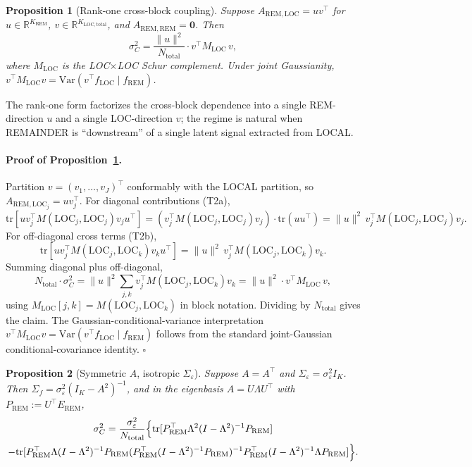 \documentclass[11pt,letterpaper]{article}
\newtheorem{proposition}{Proposition}
\theoremstyle{remark}
\newcommand{\REM}{\mathrm{REM}}
\newcommand{\LOC}{\mathrm{LOC}}
\newcommand{\Sigmaf}{\Sigma_f}
\newcommand{\Sigmae}{\Sigma_\varepsilon}
\newcommand{\Mloc}{M_{\LOC}}
\newcommand{\Ntot}{N_{\mathrm{total}}}
\newcommand{\sigC}{\sigma^2_C}
\newcommand{\trace}{\mathrm{tr}}
\newcommand{\Var}{\mathrm{Var}}
\begin{document}
\begin{proposition}[Rank-one cross-block coupling]\label{prop:P2}
Suppose $A_{\REM, \LOC} = u v^\top$ for $u \in \mathbb{R}^{K_\REM}$, $v \in \mathbb{R}^{K_{\LOC, \mathrm{total}}}$, and $A_{\REM, \REM} = \mathbf{0}$. Then
\begin{equation*}
\sigma^2_C = \frac{\|u\|^2}{\Ntot} \cdot v^\top \Mloc \, v,
\end{equation*}
where $\Mloc$ is the LOC$\times$LOC Schur complement. Under joint Gaussianity, $v^\top \Mloc v = \Var(v^\top f_\LOC \mid f_\REM)$.
\end{proposition}

The rank-one form factorizes the cross-block dependence into a single REM-direction $u$ and a single LOC-direction $v$; the regime is natural when REMAINDER is ``downstream'' of a single latent signal extracted from LOCAL.

\paragraph{Proof of Proposition~\ref{prop:P2}.} Partition $v = (v_1, \ldots, v_J)^\top$ conformably with the LOCAL partition, so $A_{\REM, \LOC_j} = u v_j^\top$. For diagonal contributions (T2a),
\begin{equation*}
\trace\!\left[u v_j^\top M(\LOC_j, \LOC_j) v_j u^\top\right] = (v_j^\top M(\LOC_j, \LOC_j) v_j) \cdot \trace(u u^\top) = \|u\|^2 \, v_j^\top M(\LOC_j, \LOC_j) v_j.
\end{equation*}
For off-diagonal cross terms (T2b),
\begin{equation*}
\trace\!\left[u v_j^\top M(\LOC_j, \LOC_k) v_k u^\top\right] = \|u\|^2 \, v_j^\top M(\LOC_j, \LOC_k) v_k.
\end{equation*}
Summing diagonal plus off-diagonal,
\begin{equation*}
\Ntot \cdot \sigC = \|u\|^2 \sum_{j, k} v_j^\top M(\LOC_j, \LOC_k) v_k = \|u\|^2 \cdot v^\top \Mloc \, v,
\end{equation*}
using $\Mloc[j, k] = M(\LOC_j, \LOC_k)$ in block notation. Dividing by $\Ntot$ gives the claim. The Gaussian-conditional-variance interpretation $v^\top \Mloc v = \Var(v^\top f_\LOC \mid f_\REM)$ follows from the standard joint-Gaussian conditional-covariance identity. $\square$

\begin{proposition}[Symmetric $A$, isotropic $\Sigmae$]\label{prop:P3}
Suppose $A = A^\top$ and $\Sigmae = \sigma_\varepsilon^2 I_K$. Then $\Sigmaf = \sigma_\varepsilon^2 (I_K - A^2)^{-1}$, and in the eigenbasis $A = U \Lambda U^\top$ with $P_\REM := U^\top E_\REM$,
\begin{multline*}
\sigma^2_C = \frac{\sigma_\varepsilon^2}{\Ntot} \Bigl\{ \trace[P_\REM^\top \Lambda^2 (I - \Lambda^2)^{-1} P_\REM] \\
- \trace[P_\REM^\top \Lambda (I - \Lambda^2)^{-1} P_\REM (P_\REM^\top (I - \Lambda^2)^{-1} P_\REM)^{-1} P_\REM^\top (I - \Lambda^2)^{-1} \Lambda P_\REM] \Bigr\}.
\end{multline*}
\end{proposition}
\end{document}
